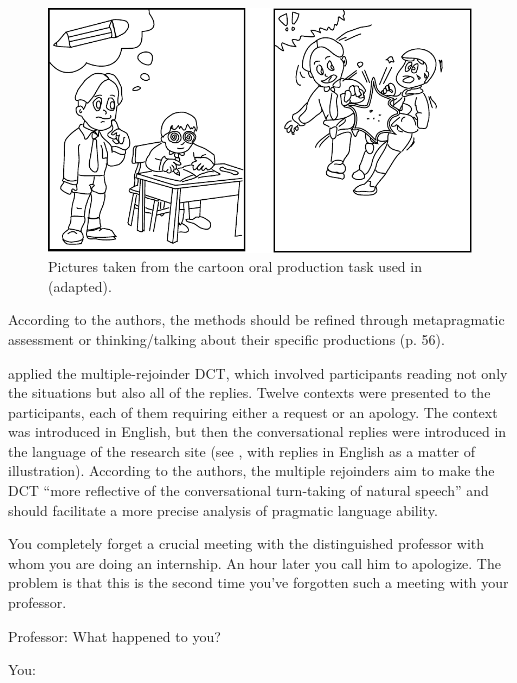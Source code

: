 \documentclass[output=paper]{LSP/langsci}
\begin{document}
\begin{figure}[H]
\includegraphics[width=\textwidth]{figures/comic.pdf}
\caption{Pictures taken from the cartoon oral production task used in \citet{Rose2000} (adapted).}
\label{fig:van:2}
\end{figure}

According to the authors, the methods should be refined through metapragmatic assessment or thinking/talking about their specific productions (p. 56). 

\citet{Cohen2003} applied the multiple-rejoinder DCT, which involved par\-ti\-ci\-pants reading not only the situations but also all of the replies. Twelve contexts were presented to the par\-ti\-ci\-pants, each of them requiring either a request or an apology. The context was introduced in English, but then the conversational replies were introduced in the language of the research site (see , with replies in English as a matter of illustration). According to the authors, the multiple rejoinders aim to make the DCT “more reflective of the conversational turn-taking of natural speech” and should facilitate a more precise analysis of pragmatic language ability.


\ea%
    \label{ex:van:7} 

         You completely forget a crucial meeting with the distinguished professor with whom you are doing an internship. An hour later you call him to apologize. The problem is that this is the second time you’ve forgotten such a meeting with your professor.   



Professor: What happened to you?


You: {\longrule}{\longrule}{\longrule}{\longrule}{\longrule}{\longrule}{\longrule}{\longrule}{\longrule}{\longrule}{\longrule}{\longrule}{\longrule}{\longrule}{\longrule}{\longrule}
\end{document}
